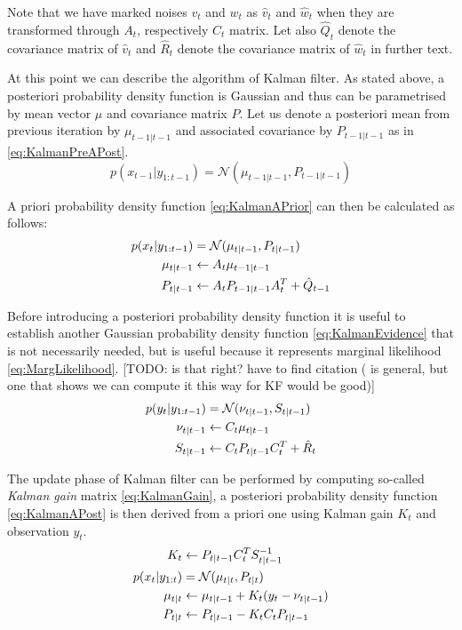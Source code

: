 \documentclass[a4paper,12pt,oneside]{report}
\newcommand{\pdf}{probability density function}
\newcommand{\assign}{\leftarrow} %
\begin{document}
Note that we have marked noises \(v_t\) and \(w_t\) as \(\hat{v}_t\) and \(\hat{w}_t\) when they
are transformed through \(A_t\), respectively \(C_t\) matrix. Let also \(\hat{Q}_t\) denote the
covariance matrix of \(\hat{v}_t\) and \(\hat{R}_t\) denote the covariance matrix of \(\hat{w}_t\)
in further text.

At this point we can describe the algorithm of Kalman filter. As stated above, a posteriori {\pdf}
is Gaussian and thus can be parametrised by mean vector \(\mu\) and covariance matrix \(P\). Let us
denote a posteriori mean from previous iteration by \(\mu_{t-1|t-1}\) and associated covariance by
\(P_{t-1|t-1}\) as in \eqref{eq:KalmanPreAPost}.
\begin{equation} \label{eq:KalmanPreAPost}
	p(x_{t-1} | y_{1:t-1}) = \mathcal{N}(\mu_{t-1|t-1}, P_{t-1|t-1})
\end{equation}

A priori {\pdf} \eqref{eq:KalmanAPrior} can then be calculated as follows:~\cite{AruMasGor:02}
\begin{align}
	p(x_t | y_{1:t-1}) &= \mathcal{N}(\mu_{t|t-1}, P_{t|t-1}) \label{eq:KalmanAPrior} \\
	\mu_{t|t-1} &\assign A_t \mu_{t-1|t-1} \notag \\
	P_{t|t-1} &\assign A_t P_{t-1|t-1} A_t^T + \hat{Q}_{t-1} \notag
\end{align}

Before introducing a posteriori {\pdf} it is useful to establish another Gaussian {\pdf}
\eqref{eq:KalmanEvidence} that is not necessarily needed, but is useful because it represents
marginal likelihood \eqref{eq:MargLikelihood}. %
[TODO: is that right? have to find citation (\cite{Smi:10} is general, but one that shows we can compute it this way for KF would be good)]
\begin{align}
	p(y_t|y_{1:t-1}) &= \mathcal{N}(\nu_{t|t-1}, S_{t|t-1}) \label{eq:KalmanEvidence} \\
	\nu_{t|t-1} &\assign C_t \mu_{t|t-1} \notag \\
	S_{t|t-1} &\assign C_t P_{t|t-1} C_t^T + \hat{R}_t \notag
\end{align}

The update phase of Kalman filter can be performed by computing so-called \emph{Kalman gain} matrix
\eqref{eq:KalmanGain}, a posteriori {\pdf} \eqref{eq:KalmanAPost} is then derived from a priori one
using Kalman gain \(K_t\) and observation \(y_t\).~\cite{AruMasGor:02}
\begin{align}
	K_t &\assign P_{t|t-1} C_t^T S_{t|t-1}^{-1} \label{eq:KalmanGain} \\[\parskip]
	p(x_t|y_{1:t}) &= \mathcal{N}(\mu_{t|t}, P_{t|t}) \label{eq:KalmanAPost} \\
	\mu_{t|t} &\assign \mu_{t|t-1} + K_t(y_t - \nu_{t|t-1}) \notag \\
	P_{t|t} &\assign P_{t|t-1} - K_t C_t P_{t|t-1} \notag
\end{align}
\end{document}
